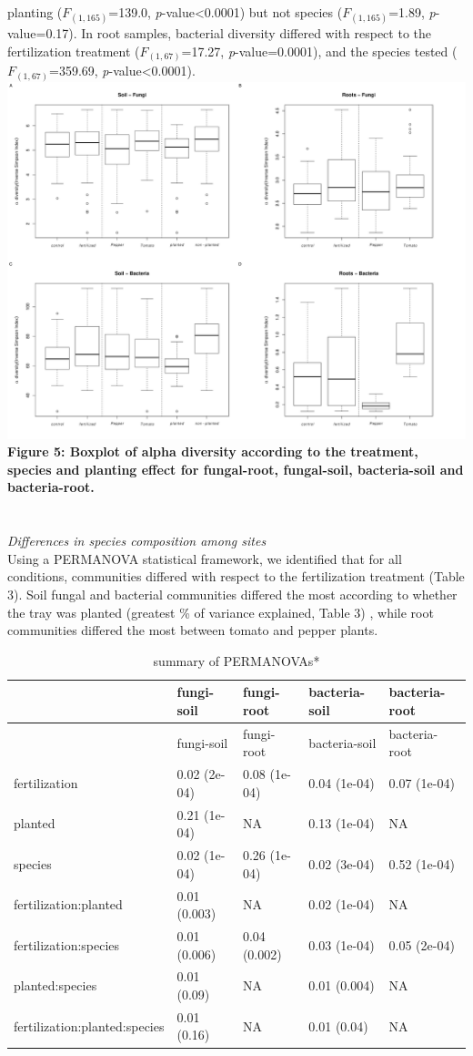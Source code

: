 \documentclass[11pt,]{article}
\begin{document}
planting (\(F_{(1,165)}\)=139.0, \emph{p}-value\textless{}0.0001) but
not species (\(F_{(1,165)}\)=1.89, \emph{p}-value=0.17). In root
samples, bacterial diversity differed with respect to the fertilization
treatment (\(F_{(1,67)}\)=17.27, \emph{p}-value=0.0001), and the species
tested (\(F_{(1,67)}\)=359.69, \emph{p}-value\textless{}0.0001). ~\\
\includegraphics[width=6.25000in]{../figures/Figure5_alpha.pdf}\\
\textbf{Figure 5: Boxplot of alpha diversity according to the treatment,
species and planting effect for fungal-root, fungal-soil, bacteria-soil
and bacteria-root.}\\
\hspace*{0.333em}\\
\hspace*{0.333em}\\
\emph{Differences in species composition among sites}\\
Using a PERMANOVA statistical framework, we identified that for all
conditions, communities differed with respect to the fertilization
treatment (Table 3). Soil fungal and bacterial communities differed the
most according to whether the tray was planted (greatest \% of variance
explained, Table 3) , while root communities differed the most between
tomato and pepper plants.

\begin{longtable}[]{@{}lllll@{}}
\caption{summary of PERMANOVAs*}\tabularnewline
\toprule
& fungi-soil & fungi-root & bacteria-soil & bacteria-root\tabularnewline
\midrule
\endfirsthead
\toprule
& fungi-soil & fungi-root & bacteria-soil & bacteria-root\tabularnewline
\midrule
\endhead
fertilization & 0.02 (2e-04) & 0.08 (1e-04) & 0.04 (1e-04) & 0.07
(1e-04)\tabularnewline
planted & 0.21 (1e-04) & NA & 0.13 (1e-04) & NA\tabularnewline
species & 0.02 (1e-04) & 0.26 (1e-04) & 0.02 (3e-04) & 0.52
(1e-04)\tabularnewline
fertilization:planted & 0.01 (0.003) & NA & 0.02 (1e-04) &
NA\tabularnewline
fertilization:species & 0.01 (0.006) & 0.04 (0.002) & 0.03 (1e-04) &
0.05 (2e-04)\tabularnewline
planted:species & 0.01 (0.09) & NA & 0.01 (0.004) & NA\tabularnewline
fertilization:planted:species & 0.01 (0.16) & NA & 0.01 (0.04) &
NA\tabularnewline
\bottomrule
\end{longtable}
\end{document}
